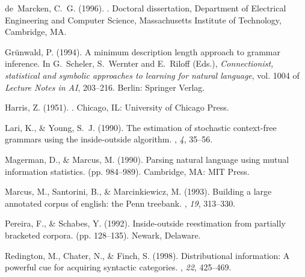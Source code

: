 \documentclass[letterpaper,mlapa]{article}
\begin{document}
\begin{thebibliography}{}
de~Marcken, C.~G. (1996).
.
\newblock Doctoral dissertation, Department of Electrical Engineering and
  Computer Science, Massachusetts Institute of Technology, Cambridge, MA.

Gr{\"u}nwald, P. (1994).
\newblock A minimum description length approach to grammar inference.
\newblock In G.~Scheler, S.~Wernter and E.~Riloff (Eds.), {\em Connectionist,
  statistical and symbolic approaches to learning for natural language}, vol.
  1004 of {\em Lecture Notes in {AI}},  203--216. Berlin: Springer Verlag.

Harris, Z. (1951).
.
\newblock Chicago, IL: University of Chicago Press.

Lari, K., \& Young, S.~J. (1990).
\newblock The estimation of stochastic context-free grammars using the
  inside-outside algorithm.
, {\em 4}, 35--56.

Magerman, D., \& Marcus, M. (1990).
\newblock Parsing natural language using mutual information statistics.
 (pp.\/ 984--989).
\newblock Cambridge, MA: MIT Press.

Marcus, M., Santorini, B., \& Marcinkiewicz, M. (1993).
\newblock Building a large annotated corpus of english: the {P}enn treebank.
, {\em 19}, 313--330.

Pereira, F., \& Schabes, Y. (1992).
\newblock Inside-outside reestimation from partially bracketed corpora.
 (pp.\/ 128--135).
\newblock Newark, Delaware.

Redington, M., Chater, N., \& Finch, S. (1998).
\newblock Distributional information: A powerful cue for acquiring syntactic
  categories.
, {\em 22}, 425--469.


\end{thebibliography}
\end{document}
